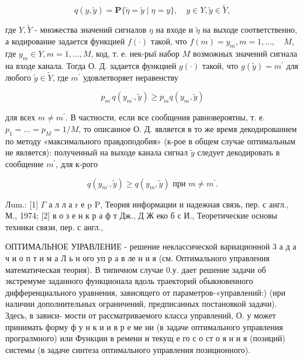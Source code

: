 \documentclass[10pt]{article}
\begin{document}
\[
q(y, \tilde{y})=\mathbf{P}\{\tilde{\eta}=\tilde{y} \mid \eta=y\}, \quad y \in Y, \tilde{y} \in \tilde{Y},
\]

где $Y, \tilde{Y}$ - множества значений сигналов $\eta$ на входе и $\tilde{\eta}$ на выходе соответственно, а кодирование задается функцией $f(\cdot)$ такой, что $f(m)=y_{m}, m=1, \ldots, \quad M$, где $y_{m} \in Y, m=1, \ldots, M$, код, т. е. нек-рыї набор $M$ возможных значений сигнала на входе канала. Тогда О. Д. задается функцией $g(\cdot)$ такой, что $g(\tilde{y})=m^{\prime}$ для любого $\tilde{y} \in \tilde{Y}$, где $m^{\prime}$ удовлетворяет неравенству

\[
p_{m^{\prime}} q\left(y_{m^{\prime}}, \tilde{y}\right) \geqslant p_{m} q\left(y_{m}, \tilde{y}\right)
\]

для всех $m \neq m^{\prime}$. В частности, если все сообщения равновероятны, т. е. $p_{1}=\ldots=p_{M}=1 / M$, то описанное О. Д. является в то же время декодированием по методу «максимального правдоподобия» (к-рое в общем случае оптимальным не является): полученный на выходе канала сигнал $\tilde{y}$ следует декодировать в сообщение $m^{\prime}$, для к-рого

\[
q\left(y_{m^{\prime}}, \tilde{y}\right) \geqslant q\left(y_{m}, \tilde{y}\right) \text { при } m \neq m^{\prime} .
\]

Лum.: [1] $\Gamma$ а л л а $\mathrm{r}$ е p $\mathrm{P}$, Теория информации и надежная связь, пер. с англ., М., 1974; [2] в о з е н к р а ф т Дж., Д Ж еко б с И., Теоретические основы техники связи, пер. с англ.,

ОПТИМАЛЬНОЕ УІРАВЛЕНИЕ - решение неклассической вариационной 3 а д а ч и о п т и м а Л ь н ого уп р а в ле н и я (см. Оптимального управления математическая теория). В типичном случае 0.у. дает решение задачи об экстремуме заданного функционала вдоль траекторий обыкновенного дифференциального уравнения, зависящего от параметров-«управлений:) (нри наличии дополнительных ограничений, предписанных постановкой задачи). Здесь, в зависи- мости от рассматриваемого класса управлений, О. у может принимать форму ф у н к и и в р е ме ни (в задаче оптимального управления програлмного) или Функции в ремени и текущ е го с о ст о я н и я (позиций) системы (в задаче синтеза оптимального управления позиционного).
\end{document}
